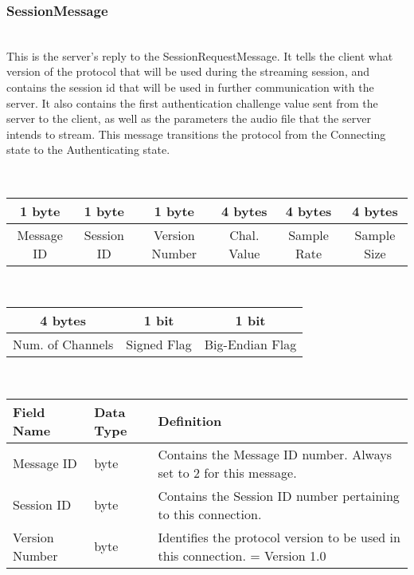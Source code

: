 \documentclass[12pt,letterpaper,titlepage]{article}
\begin{document}
\subsubsection{SessionMessage}
	\begin{description}
	\item[Description] \hfill \\
		This is the server's reply to the SessionRequestMessage. It tells the client what version of 
		the protocol that will be used during the streaming session, and contains the session id 
		that will be used in further communication with the server.  It also contains the first 
		authentication challenge value sent from the server to the client, as well as the parameters 
		the audio file that the server intends to stream.
		This message transitions the protocol from the Connecting state to the Authenticating state.
	\item[Message Format] \hfill \\
	\begin{tabular}{ | c | c | c | c | c | c |}
		\hline
		1 byte & 1 byte & 1 byte & 4 bytes & 4 bytes & 4 bytes  \\
		\hline
		Message ID & Session ID & Version Number & Chal. Value & Sample Rate & Sample Size  \\
		\hline
	\end{tabular}
	\item \hfill \\
	\begin{tabular}{ | c | c | c |}
		\hline
		4 bytes & 1 bit & 1 bit \\
		\hline
		Num. of Channels   & Signed Flag  & Big-Endian Flag \\
		\hline
	\end{tabular}
	\item[Message Field Definitions] \hfill \\
	\begin{tabular}{ | p{3cm} | p{1.5cm} | p{8cm} | }
		\hline
		Field Name & Data Type & Definition \\
		\hline
		Message ID & byte & Contains the Message ID number. \newline Always set to 2 for this message. \\
		\hline
		Session ID & byte & Contains the Session ID number pertaining to this connection. \\
		\hline
		Version Number & byte & Identifies the protocol version to be used in this connection.
						\newline 1 = Version 1.0 \\

\end{tabular}
\end{description}
\end{document}
